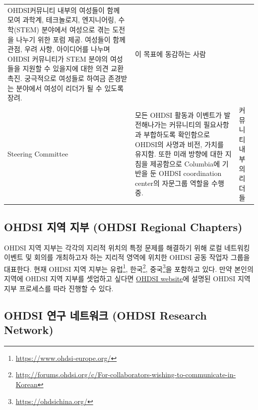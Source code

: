 \documentclass[11pt]{book}
\let\rmarkdownfootnote\footnote%
\def\footnote{\protect\rmarkdownfootnote}
\theoremstyle{definition}
\theoremstyle{definition}
\theoremstyle{definition}
\theoremstyle{remark}
\begin{document}
\begin{longtable}[]{@{}lll@{}}
\begin{minipage}[t]{0.46\columnwidth}
OHDSI커뮤니티 내부의 여성들이 함께 모여 과학계, 테크놀로지, 엔지니어링,
수학(STEM) 분야에서 여성으로 겪는 도전을 나누기 위한 포럼 제공. 여성들이
함께 관점, 우려 사항, 아이디어를 나누며 OHDSI 커뮤니티가 STEM 분야의
여성들을 지원할 수 있을지에 대한 의견 교환 촉진. 궁극적으로 여성들로
하여금 존경받는 분야에서 여성이 리더가 될 수 있도록 장려.\strut
\end{minipage} & \begin{minipage}[t]{0.37\columnwidth}\raggedright\strut
이 목표에 동감하는 사람\strut
\end{minipage}\tabularnewline
\begin{minipage}[t]{0.09\columnwidth}\raggedright\strut
Steering Committee\strut
\end{minipage} & \begin{minipage}[t]{0.46\columnwidth}\raggedright\strut
모든 OHDSI 활동과 이벤트가 발전해나가는 커뮤니티의 필요사항과 부합하도록
확인함으로 OHDSI의 사명과 비전, 가치를 유지함. 또한 미래 방향에 대한
지침을 제공함으로 Columbia에 기반을 둔 OHDSI coordination center의
자문그룹 역할을 수행중.\strut
\end{minipage} & \begin{minipage}[t]{0.37\columnwidth}\raggedright\strut
커뮤니티 내부의 리더들\strut
\end{minipage}\tabularnewline
\bottomrule
\end{longtable}

\subsection{OHDSI 지역 지부 (OHDSI Regional
Chapters)}\label{ohdsi---ohdsi-regional-chapters}

OHDSI 지역 지부는 각각의 지리적 위치의 특정 문제를 해결하기 위해 로컬
네트워킹 이벤트 및 회의를 개최하고자 하는 지리적 영역에 위치한 OHDSI
공동 작업자 그룹을 대표한다. 현재 OHDSI 지역 지부는 유럽\footnote{\url{https://www.ohdsi-europe.org/}},
한국\footnote{\url{http://forums.ohdsi.org/c/For-collaborators-wishing-to-communicate-in-Korean}},
중국\footnote{\url{https://ohdsichina.org/}}을 포함하고 있다. 만약
본인의 지역에 OHDSI 지역 지부를 셋업하고 싶다면
\href{https://www.ohdsi.org/who-we-are/regional-chapters}{OHDSI
website}에 설명된 OHDSI 지역 지부 프로세스를 따라 진행할 수 있다.

\subsection{OHDSI 연구 네트워크 (OHDSI Research
Network)}\label{ohdsi---ohdsi-research-network}
\end{document}
